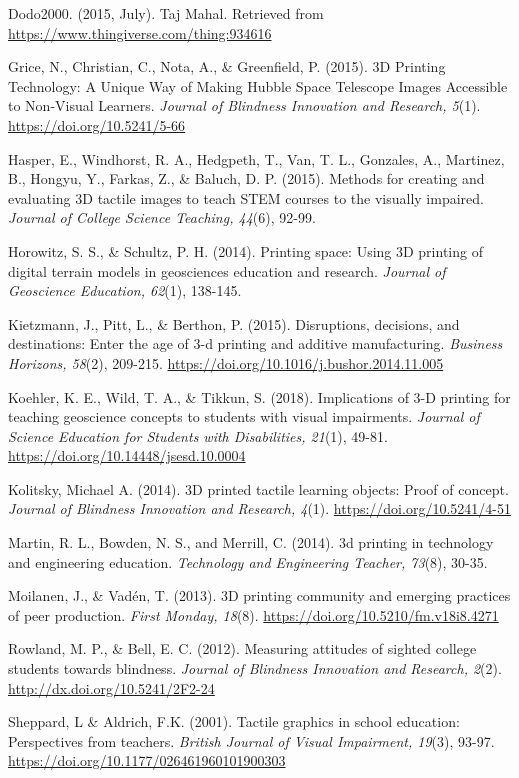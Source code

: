\documentclass[11.5pt]{sig-alternate} %
\begin{document}
\begin{hangparas}{0.25in}{1}
Dodo2000. (2015, July). Taj Mahal. Retrieved from \url{https://www.thingiverse.com/thing:934616}

Grice, N., Christian, C., Nota, A., \& Greenfield, P. (2015). 3D Printing Technology: A Unique Way of Making Hubble Space Telescope Images Accessible to Non-Visual Learners. \textit{Journal of Blindness Innovation and Research, 5}(1). \url{https://doi.org/10.5241/5-66}

Hasper, E., Windhorst, R. A., Hedgpeth, T., Van, T. L., Gonzales, A., Martinez, B., Hongyu, Y., Farkas, Z., \& Baluch, D. P. (2015). Methods for creating and evaluating 3D tactile images to teach STEM courses to the visually impaired. \textit{Journal of College Science Teaching, 44}(6), 92-99.

Horowitz, S. S., \& Schultz, P. H. (2014). Printing space: Using 3D printing of digital terrain models in geosciences education and research. \textit{Journal of Geoscience Education, 62}(1), 138-145.

Kietzmann, J., Pitt, L., \& Berthon, P. (2015). Disruptions, decisions, and destinations: Enter the age of 3-d printing and additive manufacturing. \textit{Business Horizons, 58}(2), 209-215. \url{https://doi.org/10.1016/j.bushor.2014.11.005}

Koehler, K. E., Wild, T. A., \& Tikkun, S. (2018). Implications of 3-D printing for teaching geoscience concepts to students with visual impairments. \textit{Journal of Science Education for Students with Disabilities, 21}(1), 49-81. \url{https://doi.org/10.14448/jsesd.10.0004}

Kolitsky, Michael A. (2014). 3D printed tactile learning objects: Proof of concept. \textit{Journal of Blindness Innovation and Research, 4}(1). \url{https://doi.org/10.5241/4-51}

Martin, R. L., Bowden, N. S., and Merrill, C. (2014). 3d printing in technology and engineering education. \textit{Technology and Engineering Teacher, 73}(8), 30-35. 

Moilanen, J., \& Vadén, T. (2013). 3D printing community and emerging practices of peer production. \textit{First Monday, 18}(8). \url{https://doi.org/10.5210/fm.v18i8.4271}

Rowland, M. P., \& Bell, E. C. (2012). Measuring attitudes of sighted college students towards blindness. \textit{Journal of Blindness Innovation and Research, 2}(2). \url{http://dx.doi.org/10.5241/2F2-24}

Sheppard, L \& Aldrich, F.K. (2001). Tactile graphics in school education: Perspectives from teachers. \textit{British Journal of Visual Impairment, 19}(3), 93-97. \url{https://doi.org/10.1177/026461960101900303}


\end{hangparas}
\end{document}
